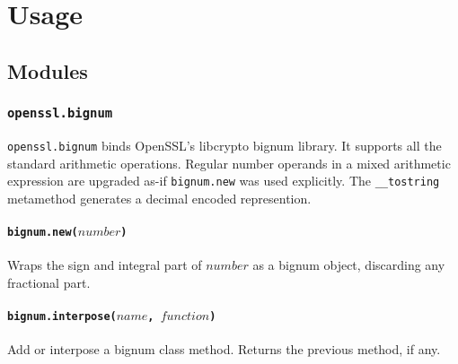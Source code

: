 \documentclass[11pt, oneside]{memoir}
\newcommand*{\fn}[1]{\texttt{#1}\xspace}
\newcommand*{\method}[1]{\texttt{#1}\xspace}
\newcommand*{\module}[1]{\texttt{#1}\xspace}
\newcounter{toccols}
\newenvironment{Module}[1]{
	\subsection{\texttt{#1}}
	\addtocontents{toc}{
		\protect\begin{multicols}{\value{toccols}}
	}
}{
	\addtocontents{toc}{\protect\end{multicols}}
}
\begin{document}
\chapter{Usage}

\section{Modules}

\begin{Module}{openssl.bignum}

\module{openssl.bignum} binds OpenSSL's libcrypto bignum library. It supports all the standard arithmetic operations. Regular number operands in a mixed arithmetic expression are upgraded as-if \method{bignum.new} was used explicitly. The \fn{\_\_tostring} metamethod generates a decimal encoded represention.

\subsubsection[\fn{bignum.new}]{\fn{bignum.new($number$)}}

Wraps the sign and integral part of $number$ as a bignum object, discarding any fractional part.

\subsubsection[\fn{bignum.interpose}]{\fn{bignum.interpose($name$, $function$)}}

Add or interpose a bignum class method. Returns the previous method, if any.

\end{Module}
\end{document}
